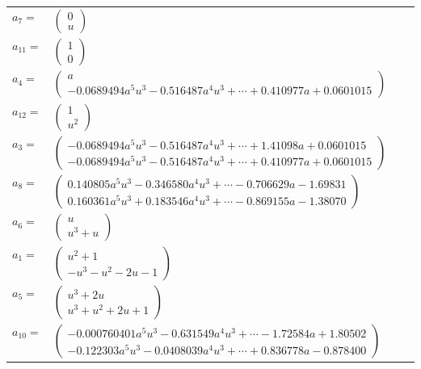 \documentclass[1p]{elsarticle_modified}
\theoremstyle{definition}
\begin{document}
\begin{tabular}{m{7pt} m{180pt} m{7pt} m{180pt} }
\flushright $a_{7}=$&$\begin{pmatrix}0\\u\end{pmatrix}$ \\
\flushright $a_{11}=$&$\begin{pmatrix}1\\0\end{pmatrix}$ \\
\flushright $a_{4}=$&$\begin{pmatrix}a\\-0.0689494 a^{5} u^{3}-0.516487 a^{4} u^{3}+\cdots+0.410977 a+0.0601015\end{pmatrix}$ \\
\flushright $a_{12}=$&$\begin{pmatrix}1\\u^2\end{pmatrix}$ \\
\flushright $a_{3}=$&$\begin{pmatrix}-0.0689494 a^{5} u^{3}-0.516487 a^{4} u^{3}+\cdots+1.41098 a+0.0601015\\-0.0689494 a^{5} u^{3}-0.516487 a^{4} u^{3}+\cdots+0.410977 a+0.0601015\end{pmatrix}$ \\
\flushright $a_{8}=$&$\begin{pmatrix}0.140805 a^{5} u^{3}-0.346580 a^{4} u^{3}+\cdots-0.706629 a-1.69831\\0.160361 a^{5} u^{3}+0.183546 a^{4} u^{3}+\cdots-0.869155 a-1.38070\end{pmatrix}$ \\
\flushright $a_{6}=$&$\begin{pmatrix}u\\u^3+u\end{pmatrix}$ \\
\flushright $a_{1}=$&$\begin{pmatrix}u^2+1\\- u^3- u^2-2 u-1\end{pmatrix}$ \\
\flushright $a_{5}=$&$\begin{pmatrix}u^3+2 u\\u^3+u^2+2 u+1\end{pmatrix}$ \\
\flushright $a_{10}=$&$\begin{pmatrix}-0.000760401 a^{5} u^{3}-0.631549 a^{4} u^{3}+\cdots-1.72584 a+1.80502\\-0.122303 a^{5} u^{3}-0.0408039 a^{4} u^{3}+\cdots+0.836778 a-0.878400\end{pmatrix}$ \\

\end{tabular}
\end{document}
